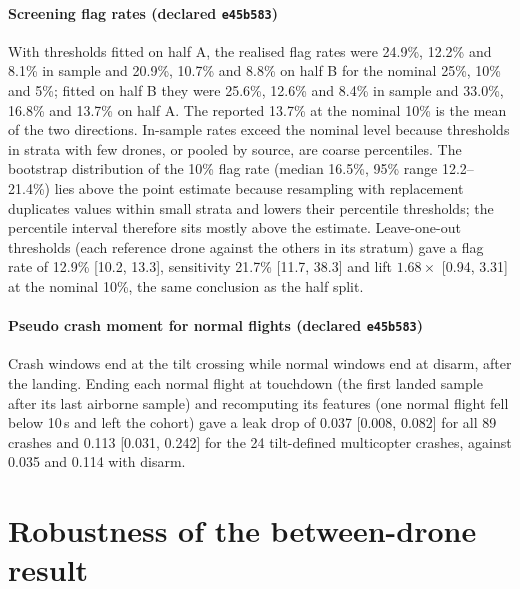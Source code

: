 \documentclass[preprint,12pt]{elsarticle}
\begin{document}
\paragraph{Screening flag rates (declared \texttt{e45b583})} With thresholds fitted on half A, the realised flag rates were 24.9\%, 12.2\% and 8.1\% in sample and 20.9\%, 10.7\% and 8.8\% on half B for the nominal 25\%, 10\% and 5\%; fitted on half B they were 25.6\%, 12.6\% and 8.4\% in sample and 33.0\%, 16.8\% and 13.7\% on half A. The reported 13.7\% at the nominal 10\% is the mean of the two directions. In-sample rates exceed the nominal level because thresholds in strata with few drones, or pooled by source, are coarse percentiles. The bootstrap distribution of the 10\% flag rate (median 16.5\%, 95\% range 12.2--21.4\%) lies above the point estimate because resampling with replacement duplicates values within small strata and lowers their percentile thresholds; the percentile interval therefore sits mostly above the estimate. Leave-one-out thresholds (each reference drone against the others in its stratum) gave a flag rate of 12.9\% [10.2, 13.3], sensitivity 21.7\% [11.7, 38.3] and lift $1.68\times$ [0.94, 3.31] at the nominal 10\%, the same conclusion as the half split.

\paragraph{Pseudo crash moment for normal flights (declared \texttt{e45b583})} Crash windows end at the tilt crossing while normal windows end at disarm, after the landing. Ending each normal flight at touchdown (the first landed sample after its last airborne sample) and recomputing its features (one normal flight fell below 10\,s and left the cohort) gave a leak drop of 0.037 [0.008, 0.082] for all 89 crashes and 0.113 [0.031, 0.242] for the 24 tilt-defined multicopter crashes, against 0.035 and 0.114 with disarm.
\FloatBarrier

\section{Robustness of the between-drone result}
\label{sup:robust}
\end{document}
